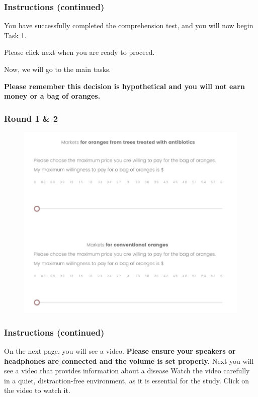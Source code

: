 \documentclass[12pt]{article}
\begin{document}
\vspace{0.5cm}

\subsubsection*{\textbf{Instructions (continued)}}

You have successfully completed the comprehension test, and you will now begin Task 1.\par

\vspace{0.5cm}
 Please click next when you are ready to proceed.

Now, we will go to the main tasks. 

\textbf{Please remember this decision is hypothetical and you will not earn money or a bag of oranges.}

\clearpage

\subsubsection*{\centering \textbf{Round 1 \& 2}}

\begin{figure}[H]
    \centering
    \includegraphics[width=0.8\linewidth]{BDM_market.jpg}
    \caption{}
    \label{fig:BDM_market}
\end{figure}

\clearpage

\subsubsection*{\textbf{Instructions (continued)}}
On the next page, you will see a video. \textbf{Please ensure your speakers or headphones are connected and the volume is set properly.} Next you will see a video that provides information about a disease Watch the video carefully in a quiet, distraction-free environment, as it is essential for the study.
\vspace{0.5cm}
Click on the video to watch it.
\end{document}
